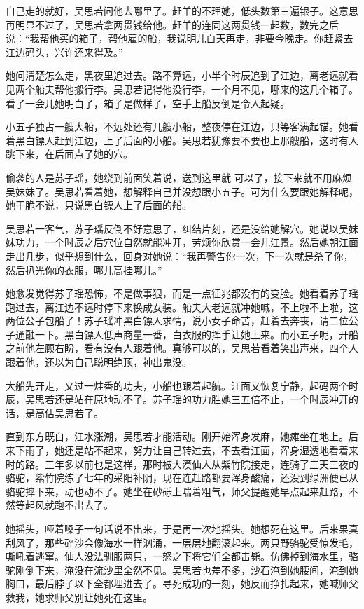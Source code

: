 自己走的就好，吴思若问他去哪里了。赶羊的不理她，低头数第三遍银子。这意思再明显不过了，吴思若拿两贯钱给他。赶羊的连同这两贯钱一起数，数完之后说：“我帮他买的箱子，帮他雇的船，我说明儿白天再走，非要今晚走。你赶紧去江边码头，兴许还来得及。”

她问清楚怎么走，黑夜里追过去。路不算远，小半个时辰追到了江边，离老远就看见两个船夫帮他搬行李。吴思若记得他没行李，一个月不见，哪来的这几个箱子。看了一会儿她明白了，箱子是做样子，空手上船反倒是令人起疑。

小五子独占一艘大船，不远处还有几艘小船，整夜停在江边，只等客满起锚。她看着黑白镖人赶到江边，上了后面的小船。吴思若犹豫要不要也上那艘船，这时有人跳下来，在后面点了她的穴。

偷袭的人是苏子瑶，她绕到前面笑着说，送到这里就
可以了，接下来就不用麻烦吴妹妹了。吴思若看着她，想解释自己并没想跟小五子。可为什么要跟她解释呢，她干脆不说，只说黑白镖人上了后面的船。

吴思若一客气，苏子瑶反倒不好意思了，纠结片刻，还是没给她解穴。她说以吴妹妹功力，一个时辰之后穴位自然就能冲开，劳烦你欣赏一会儿江景。然后她朝江面走出几步，似乎想到什么，回身对她说：“我再警告你一次，下一次就是杀了你，然后扒光你的衣服，哪儿高挂哪儿。”

她愈发觉得苏子瑶恐怖，不是做事狠，而是一点征兆都没有的变脸。她看着苏子瑶跑过去，离江边不远时停下来换成女装。船夫大老远就冲她喊，不上啦不上啦，这两位公子包船了！苏子瑶冲黑白镖人求情，说小女子命苦，赶着去奔丧，请二位公子通融一下。黑白镖人低声商量一番，白衣服的挥手让她上来。而小五子呢，开船之前他左顾右盼，看有没有人跟着他。真够可以的，吴思若看着笑出声来，四个人跟着他，还以为自己聪明绝顶，神出鬼没。

大船先开走，又过一炷香的功夫，小船也跟着起航。江面又恢复宁静，起码两个时辰，吴思若还是站在原地动不了。苏子瑶的功力胜她三五倍不止，一个时辰冲开的话，是高估吴思若了。

直到东方既白，江水涨潮，吴思若才能活动。刚开始浑身发麻，她瘫坐在地上。后来下雨了，她还是站不起来，努力让自己转过去，不去看江面，浑身湿透地看着来时的路。三年多以前也是这样，那时被大漠仙人从紫竹院接走，连骑了三天三夜的骆驼，紫竹院练了七年的采阳补阴，现在连赶路都要浑身酸痛，还没到绿洲便已从骆驼摔下来，动也动不了。她坐在砂砾上喘着粗气，师父提醒她早点起来赶路，不然等起风就跑不出去了。

她摇头，哑着嗓子一句话说不出来，于是再一次地摇头。她想死在这里。后来果真刮风了，那些碎沙会像海水一样汹涌，一层层地翻滚起来。两只野骆驼受惊发毛，嘶吼着逃窜。仙人没法驯服两只，一怒之下将它们全都击毙。仿佛掉到海水里，骆驼刚倒下来，淹没在流沙里全然不见。吴思若也差不多，沙石淹到她腰间，淹到她胸口，最后脖子以下全都埋进去了。寻死成功的一刻，她反而挣扎起来，她喊师父救我，她求师父别让她死在这里。

